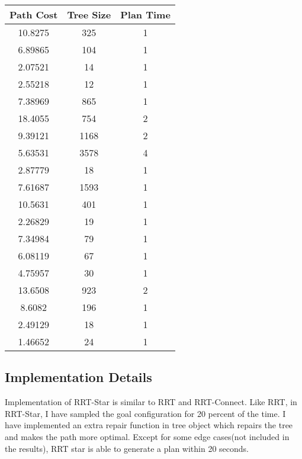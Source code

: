 \documentclass[12pt]{article}
\begin{document}
\begin{table}[h]
\centering
\begin{tabular}{|c|c|c|}
\hline
\textbf{Path Cost} & \textbf{Tree Size} & \textbf{Plan Time} \\ \hline
10.8275   & 325             & 1         \\ \hline
6.89865   & 104             & 1         \\ \hline
2.07521   & 14              & 1         \\ \hline
2.55218   & 12              & 1         \\ \hline
7.38969   & 865             & 1         \\ \hline
18.4055   & 754             & 2         \\ \hline
9.39121   & 1168            & 2         \\ \hline
5.63531   & 3578            & 4         \\ \hline
2.87779   & 18              & 1         \\ \hline
7.61687   & 1593            & 1         \\ \hline
10.5631   & 401             & 1         \\ \hline
2.26829   & 19              & 1         \\ \hline
7.34984   & 79              & 1         \\ \hline
6.08119   & 67              & 1         \\ \hline
4.75957   & 30              & 1         \\ \hline
13.6508   & 923             & 2         \\ \hline
8.6082    & 196             & 1         \\ \hline
2.49129   & 18              & 1         \\ \hline
1.46652   & 24              & 1         \\ \hline
\end{tabular}
\end{table}

\subsection{Implementation Details}
Implementation of RRT-Star is similar to RRT and RRT-Connect. Like RRT, in RRT-Star, I have sampled the goal configuration for 20 percent of the time. I have implemented an extra repair function in tree object which repairs the tree and makes the path more optimal. Except for some edge cases(not included in the results), RRT star is able to generate a plan within 20 seconds.
\end{document}
